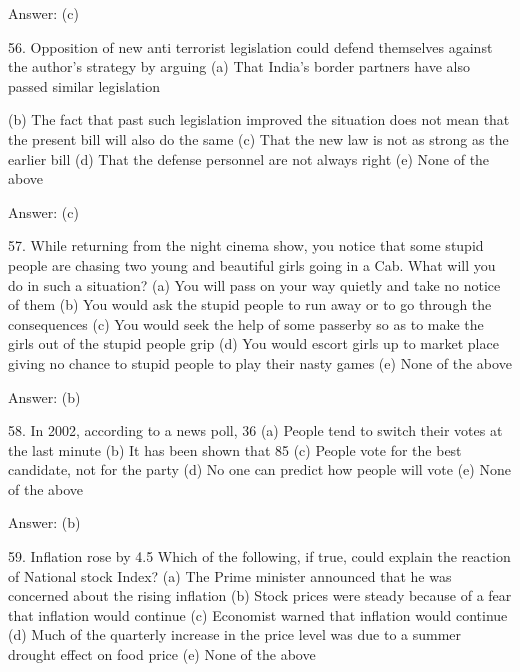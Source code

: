 Answer: (c)


56. Opposition of new anti terrorist legislation could defend themselves against the author’s strategy by arguing
(a) That India’s border partners have also passed similar legislation


(b) The fact that past such legislation improved the situation does not mean that the present bill will also do the same
(c) That the new law is not as strong as the earlier bill
(d) That the defense personnel are not always right
(e) None of the above

Answer: (c)

57. While returning from the night cinema show, you notice that some stupid people are chasing two young and beautiful girls going in a Cab. What will you do in such a situation?
(a) You will pass on your way quietly and take no notice of them
(b) You would ask the stupid people to run away or to go through the consequences
(c) You would seek the help of some passerby so as to make the girls out of the stupid people grip
(d) You would escort girls up to market place giving no chance to stupid people to play their nasty games
(e) None of the above

Answer: (b)

58. In 2002, according to a news poll, 36 %
(a) People tend to switch their votes at the last minute
(b) It has been shown that 85%
(c) People vote for the best candidate, not for the party
(d) No one can predict how people will vote
(e) None of the above

Answer: (b)

59. Inflation rose by 4.5%
Which of the following, if true, could explain the reaction of National stock Index? (a) The Prime minister announced that he was concerned about the rising inflation
(b) Stock prices were steady because of a fear that inflation would continue
(c) Economist warned that inflation would continue
(d) Much of the quarterly increase in the price level was due to a summer drought effect on food price
(e) None of the above

